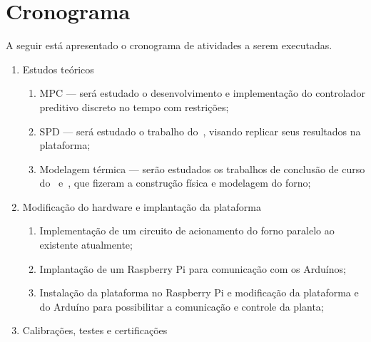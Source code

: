 
\chapter{Cronograma}%
\label{chp:chronogram}

A seguir está apresentado o cronograma de atividades a serem executadas.

\renewcommand{\labelenumii}{\theenumii}
\renewcommand{\theenumii}{\theenumi.\arabic{enumii}.}

\begin{enumerate}
      \item Estudos teóricos
            \begin{enumerate}
                  \item MPC --- será estudado o desenvolvimento e implementação
                        do controlador preditivo discreto no tempo com
                        restrições;
                  \item SPD --- será estudado o trabalho
                        do~\textcite{masterthesis:nelson}, visando replicar
                        seus resultados na plataforma;
                  \item Modelagem térmica --- serão estudados os trabalhos de
                        conclusão de curso do~\textcite{misc:nelson}
                        e~\textcite{misc:valle-silva}, que fizeram a
                        construção física e modelagem do forno;
            \end{enumerate}
      \item Modificação do hardware e implantação da plataforma
            \begin{enumerate}
                  \item Implementação de um circuito de acionamento do forno
                        paralelo ao existente atualmente;
                  \item Implantação de um Raspberry Pi para comunicação com os
                        Arduínos;
                  \item Instalação da plataforma no Raspberry Pi e modificação
                        da plataforma e do Arduíno para possibilitar a
                        comunicação e controle da planta;
            \end{enumerate}
      \item Calibrações, testes e certificações
            \begin{enumerate}

\end{enumerate}
\end{enumerate}
